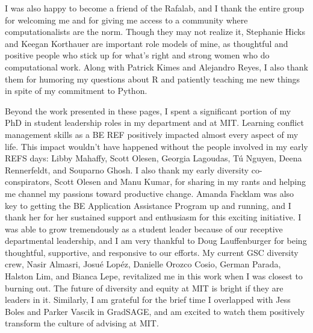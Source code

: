 \begin{singlespace}
I was also happy to become a friend of the Rafalab, and I thank the entire group for welcoming me and for giving me access to a community where computationalists are the norm.
Though they may not realize it, Stephanie Hicks and Keegan Korthauer are important role models of mine, as thoughtful and positive people who stick up for what's right and strong women who do computational work.
Along with Patrick Kimes and Alejandro Reyes, I also thank them for humoring my questions about R and patiently teaching me new things in spite of my commitment to Python.

Beyond the work presented in these pages, I spent a significant portion of my PhD in student leadership roles in my department and at MIT.
Learning conflict management skills as a BE REF positively impacted almost every aspect of my life.
This impact wouldn't have happened without the people involved in my early REFS days: Libby Mahaffy, Scott Olesen, Georgia Lagoudas, T\'{u} Nguyen, Deena Rennerfeldt, and Souparno Ghosh.
I also thank my early diversity co-conspirators, Scott Olesen and Manu Kumar, for sharing in my rants and helping me channel my passions toward productive change.
Amanda Facklam was also key to getting the BE Application Assistance Program up and running, and I thank her for her sustained support and enthusiasm for this exciting initiative.
I was able to grow tremendously as a student leader because of our receptive departmental leadership, and I am very thankful to Doug Lauffenburger for being thoughtful, supportive, and responsive to our efforts.
My current GSC diversity crew, Nasir Almasri, Josu\'{e} Lop\'{e}z, Danielle Orozco Cosio, German Parada, Halston Lim, and Bianca Lepe, revitalized me in this work when I was closest to burning out.
The future of diversity and equity at MIT is bright if they are leaders in it.
Similarly, I am grateful for the brief time I overlapped with Jess Boles and Parker Vascik in GradSAGE, and am excited to watch them positively transform the culture of advising at MIT.


\end{singlespace}
